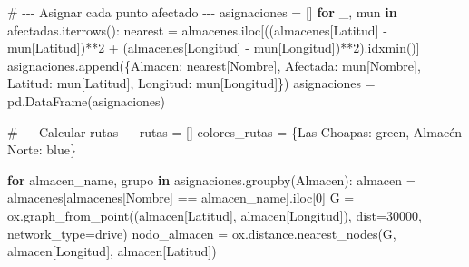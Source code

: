 \documentclass[
  spanish,
  us-letterpaper,
  DIV=11,
  numbers=noendperiod]{scrreprt}
\newenvironment{Shaded}{\begin{snugshade}}{\end{snugshade}}
\newcommand{\CommentTok}[1]{\textcolor[rgb]{0.37,0.37,0.37}{#1}}
\newcommand{\ControlFlowTok}[1]{\textcolor[rgb]{0.00,0.23,0.31}{\textbf{#1}}}
\newcommand{\DecValTok}[1]{\textcolor[rgb]{0.68,0.00,0.00}{#1}}
\newcommand{\KeywordTok}[1]{\textcolor[rgb]{0.00,0.23,0.31}{\textbf{#1}}}
\newcommand{\NormalTok}[1]{\textcolor[rgb]{0.00,0.23,0.31}{#1}}
\newcommand{\OperatorTok}[1]{\textcolor[rgb]{0.37,0.37,0.37}{#1}}
\newcommand{\StringTok}[1]{\textcolor[rgb]{0.13,0.47,0.30}{#1}}
\numberwithin{equation}{section}
\begin{document}
\begin{Shaded}
\begin{Highlighting}[]
\CommentTok{\# {-}{-}{-} Asignar cada punto afectado {-}{-}{-}}
\NormalTok{asignaciones }\OperatorTok{=}\NormalTok{ []}
\ControlFlowTok{for}\NormalTok{ \_, mun }\KeywordTok{in}\NormalTok{ afectadas.iterrows():}
\NormalTok{    nearest }\OperatorTok{=}\NormalTok{ almacenes.iloc[((almacenes[}\StringTok{\textquotesingle{}Latitud\textquotesingle{}}\NormalTok{] }\OperatorTok{{-}}
\NormalTok{     mun[}\StringTok{\textquotesingle{}Latitud\textquotesingle{}}\NormalTok{])}\OperatorTok{**}\DecValTok{2} \OperatorTok{+}\NormalTok{ (almacenes[}\StringTok{\textquotesingle{}Longitud\textquotesingle{}}\NormalTok{] }\OperatorTok{{-}} 
\NormalTok{     mun[}\StringTok{\textquotesingle{}Longitud\textquotesingle{}}\NormalTok{])}\OperatorTok{**}\DecValTok{2}\NormalTok{).idxmin()]}
\NormalTok{    asignaciones.append(\{}\StringTok{\textquotesingle{}Almacen\textquotesingle{}}\NormalTok{: nearest[}\StringTok{\textquotesingle{}Nombre\textquotesingle{}}\NormalTok{],}
     \StringTok{\textquotesingle{}Afectada\textquotesingle{}}\NormalTok{: mun[}\StringTok{\textquotesingle{}Nombre\textquotesingle{}}\NormalTok{], }\StringTok{\textquotesingle{}Latitud\textquotesingle{}}\NormalTok{: mun[}\StringTok{\textquotesingle{}Latitud\textquotesingle{}}\NormalTok{],}
      \StringTok{\textquotesingle{}Longitud\textquotesingle{}}\NormalTok{: mun[}\StringTok{\textquotesingle{}Longitud\textquotesingle{}}\NormalTok{]\})}
\NormalTok{asignaciones }\OperatorTok{=}\NormalTok{ pd.DataFrame(asignaciones)}

\CommentTok{\# {-}{-}{-} Calcular rutas {-}{-}{-}}
\NormalTok{rutas }\OperatorTok{=}\NormalTok{ []}
\NormalTok{colores\_rutas }\OperatorTok{=}\NormalTok{ \{}\StringTok{\textquotesingle{}Las Choapas\textquotesingle{}}\NormalTok{: }\StringTok{\textquotesingle{}green\textquotesingle{}}\NormalTok{, }\StringTok{\textquotesingle{}Almacén Norte\textquotesingle{}}\NormalTok{: }\StringTok{\textquotesingle{}blue\textquotesingle{}}\NormalTok{\}}

\ControlFlowTok{for}\NormalTok{ almacen\_name, grupo }\KeywordTok{in}\NormalTok{ asignaciones.groupby(}\StringTok{\textquotesingle{}Almacen\textquotesingle{}}\NormalTok{):}
\NormalTok{    almacen }\OperatorTok{=}\NormalTok{ almacenes[almacenes[}\StringTok{\textquotesingle{}Nombre\textquotesingle{}}\NormalTok{] }\OperatorTok{==}\NormalTok{ almacen\_name].iloc[}\DecValTok{0}\NormalTok{]}
\NormalTok{    G }\OperatorTok{=}\NormalTok{ ox.graph\_from\_point((almacen[}\StringTok{\textquotesingle{}Latitud\textquotesingle{}}\NormalTok{], almacen[}\StringTok{\textquotesingle{}Longitud\textquotesingle{}}\NormalTok{]),}
\NormalTok{     dist}\OperatorTok{=}\DecValTok{30000}\NormalTok{, network\_type}\OperatorTok{=}\StringTok{\textquotesingle{}drive\textquotesingle{}}\NormalTok{)}
\NormalTok{    nodo\_almacen }\OperatorTok{=}\NormalTok{ ox.distance.nearest\_nodes(G,}
\NormalTok{     almacen[}\StringTok{\textquotesingle{}Longitud\textquotesingle{}}\NormalTok{], almacen[}\StringTok{\textquotesingle{}Latitud\textquotesingle{}}\NormalTok{])}


\end{Highlighting}
\end{Shaded}
\end{document}
